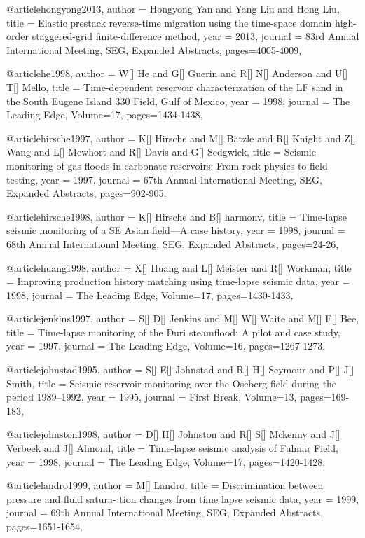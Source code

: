 @article{hongyong2013,
  author =	 {Hongyong Yan and Yang Liu and Hong Liu},
  title =	 {Elastic prestack reverse-time migration using the time-space domain high-order staggered-grid finite-difference method},
  year =	 2013,
  journal =	 {83rd Annual International Meeting, SEG, Expanded Abstracts},
 pages=4005-4009,
}

@article{he1998,
  author =	 {W[] He and G[] Guerin and R[] N[] Anderson and U[] T[] Mello},
  title =	 {Time-dependent reservoir characterization of the LF sand in the South Eugene Island 330 Field, Gulf of Mexico},
  year =	 1998,
  journal =	 {The Leading Edge},
    Volume=17,
 pages=1434-1438,
}

@article{hirsche1997,
  author =	 {K[] Hirsche and M[] Batzle and R[] Knight and Z[] Wang and L[] Mewhort and R[] Davis and G[] Sedgwick},
  title =	 {Seismic monitoring of gas floods in carbonate reservoirs: From rock physics to field testing},
  year =	 1997,
  journal =	 {67th Annual International Meeting, SEG, Expanded Abstracts},
 pages=902-905,
}

@article{hirsche1998,
  author =	 {K[] Hirsche and B[] harmonv},
  title =	 {Time-lapse seismic monitoring of a SE Asian field—A case history},
  year =	 1998,
  journal =	 {68th Annual International Meeting, SEG, Expanded Abstracts},
 pages=24-26,
}

@article{huang1998,
  author =	 {X[] Huang and L[] Meister and R[] Workman},
  title =	 {Improving production history matching using time-lapse seismic data},
  year =	 1998,
  journal =	 {The Leading Edge},
    Volume=17,
 pages=1430-1433,
}

@article{jenkins1997,
  author =	 {S[] D[] Jenkins and M[] W[] Waite and M[] F[] Bee},
  title =	 {Time-lapse monitoring of the Duri steamflood: A pilot and case study},
  year =	 1997,
  journal =	 {The Leading Edge},
    Volume=16,
 pages=1267-1273,
}


@article{johnstad1995,
  author =	 {S[] E[] Johnstad and R[] H[] Seymour and P[] J[] Smith},
  title =	 { Seismic reservoir monitoring over the Oseberg field during the period 1989–1992},
  year =	 1995,
  journal =	 {First Break},
    Volume=13,
 pages=169-183,
}


@article{johnston1998,
  author =	 {D[] H[] Johnston and R[] S[] Mckenny and J[] Verbeek and J[] Almond},
  title =	 {Time-lapse seismic analysis of Fulmar Field},
  year =	 1998,
  journal =	 {The Leading Edge},
    Volume=17,
 pages=1420-1428,
}

@article{landro1999,
  author =	 {M[] Landro},
  title =	 {Discrimination between pressure and fluid satura-
tion changes from time lapse seismic data},
  year =	 1999,
  journal =	 {69th Annual International Meeting, SEG, Expanded Abstracts},
 pages=1651-1654,
}

